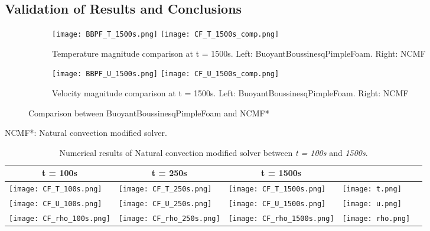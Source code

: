 \subsection{Validation of Results and Conclusions}
\begin{figure}[h!]
	\begin{subfigure}{\linewidth}
	\texttt{[image: BBPF\_T\_1500s.png]}\hfill
	\texttt{[image: CF\_T\_1500s\_comp.png]}	
	\caption{Temperature magnitude comparison at t = 1500s. Left: BuoyantBoussinesqPimpleFoam. Right: NCMF}
	\label{BBPF_NCMF}
	\end{subfigure}\par\medskip
	\begin{subfigure}{\linewidth}
	\texttt{[image: BBPF\_U\_1500s.png]}\hfill
	\texttt{[image: CF\_U\_1500s\_comp.png]}	
	\caption{Velocity magnitude comparison at t = 1500s. Left: BuoyantBoussinesqPimpleFoam. Right: NCMF}
	\end{subfigure}\par\medskip
	\caption{Comparison between BuoyantBoussinesqPimpleFoam and NCMF*}
\end{figure} 
NCMF*: Natural convection modified solver.
\begin{table}[h!]
	\begin{tabular}{@{}lllll@{}}
		\toprule[1pt]
		\multicolumn{1}{c}{\textbf{t = 100s}} & \multicolumn{1}{c}{\textbf{t = 250s}} & \multicolumn{1}{c}{\textbf{t = 1500s}} \\ \midrule[2pt] 
		\texttt{[image: CF\_T\_100s.png]} & \texttt{[image: CF\_T\_250s.png]} & \texttt{[image: CF\_T\_1500s.png]} & \texttt{[image: t.png]} \\
		\texttt{[image: CF\_U\_100s.png]} & \texttt{[image: CF\_U\_250s.png]} & \texttt{[image: CF\_U\_1500s.png]} & \texttt{[image: u.png]} \\
		\texttt{[image: CF\_rho\_100s.png]} & \texttt{[image: CF\_rho\_250s.png]} & \texttt{[image: CF\_rho\_1500s.png]} & \texttt{[image: rho.png]} \\ \bottomrule[1pt]		
	\end{tabular}
	\centering
	\caption{Numerical results of Natural convection modified solver between \textit{t = 100s} and \textit{1500s}.}	
	\label{fig:resultsNCMF}
\end{table}
